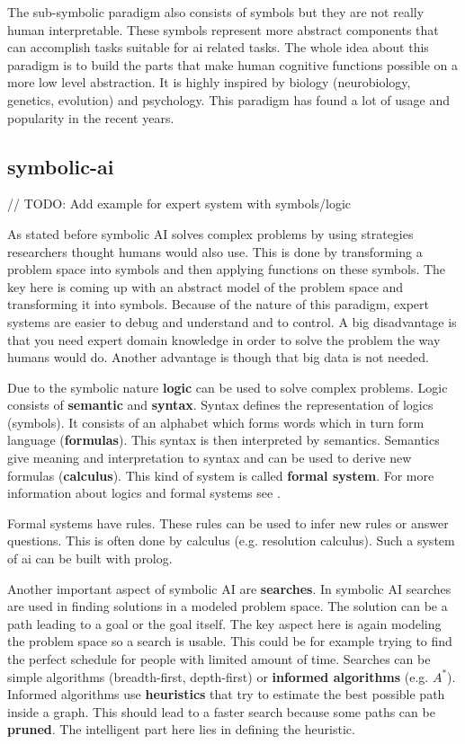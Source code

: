\documentclass[jou,apacite]{apa6}
\begin{document}
The sub-symbolic paradigm also consists of symbols but they are not really human interpretable. These symbols represent more abstract components that can accomplish tasks suitable for \gls{ai} related tasks. The whole idea about this paradigm is to build the parts that make human cognitive functions possible on a more low level abstraction. It is highly inspired by biology (neurobiology, genetics, evolution) and psychology. This paradigm has found a lot of usage and popularity in the recent years.

\subsection{\gls{symbolic-ai}}
// TODO: Add example for expert system with symbols/logic

As stated before symbolic AI solves complex problems by using strategies researchers thought humans would also use. This is done by transforming a problem space into symbols and then applying functions on these symbols. The key here is coming up with an abstract model of the problem space and transforming it into symbols. Because of the nature of this paradigm, expert systems are easier to debug and understand and to control. A big disadvantage is that you need expert domain knowledge in order to solve the problem the way humans would do. Another advantage is though that big data is not needed.

Due to the symbolic nature \textbf{logic} can be used to solve complex problems. Logic consists of \textbf{semantic} and \textbf{syntax}. Syntax defines the representation of logics (symbols). It consists of an alphabet which forms words which in turn form language (\textbf{formulas}). This syntax is then interpreted by semantics. Semantics give meaning and interpretation to syntax and can be used to derive new formulas (\textbf{calculus}). This kind of system is called \textbf{formal system}. For more information about logics and formal systems see \cite{Richardson2006}. 

Formal systems have rules. These rules can be used to infer new rules or answer questions. This is often done by calculus (e.g. resolution calculus). Such a system of \gls{ai} can be built with \gls{prolog}.

Another important aspect of symbolic AI are \textbf{searches}. In symbolic AI searches are used in finding solutions in a modeled problem space. The solution can be a path leading to a goal or the goal itself. The key aspect here is again modeling the problem space so a search is usable. This could be for example trying to find the perfect schedule for people with limited amount of time. Searches can be simple algorithms (breadth-first, depth-first) or \textbf{informed algorithms} (e.g. $A^*$). Informed algorithms use \textbf{heuristics} that try to estimate the best possible path inside a graph. This should lead to a faster search because some paths can be \textbf{pruned}. The intelligent part here lies in defining the heuristic.
\end{document}
